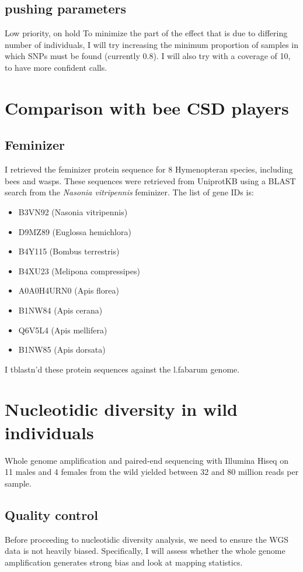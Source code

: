 \documentclass[10pt,a4paper]{report}
\begin{document}
\section{pushing parameters}
Low priority, on hold
To minimize the part of the effect that is due to differing number of individuals, I will try increasing the minimum proportion of samples in which SNPs must be found (currently 0.8). I will also try with a coverage of 10, to have more confident calls.

\chapter{Comparison with bee CSD players}

\section{Feminizer}
I retrieved the feminizer protein sequence for 8 Hymenopteran species, including bees and wasps. These sequences were retrieved from UniprotKB using a BLAST search from the \textit{Nasonia vitripennis} feminizer. The list of gene IDs is: 
\begin{itemize}
\item B3VN92 (Nasonia vitripennis)
\item D9MZ89 (Euglossa hemichlora)
\item B4Y115 (Bombus terrestris)
\item B4XU23 (Melipona compressipes)
\item A0A0H4URN0 (Apis florea)
\item B1NW84 (Apis cerana)
\item Q6V5L4 (Apis mellifera)
\item B1NW85 (Apis dorsata)
\end{itemize}

I tblastn'd these protein sequences against the l.fabarum genome.

\chapter{Nucleotidic diversity in wild individuals}
Whole genome amplification and paired-end sequencing with Illumina Hiseq on 11 males and 4 females from the wild yielded between 32 and 80 million reads per sample.

\section{Quality control}
Before proceeding to nucleotidic diversity analysis, we need to ensure the WGS data is not heavily biased. Specifically, I will assess whether the whole genome amplification generates strong bias and look at mapping statistics.
\end{document}
